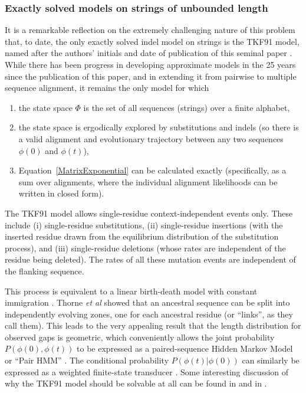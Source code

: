 \documentclass{bmcart}
\newcommand{\eqref}[1]{Equation~\ref{#1}}
\newcommand{\statespace}{\Phi}
\newcommand{\state}{\phi}
\begin{document}
\subsubsection*{Exactly solved models on strings of unbounded length}

It is a remarkable reflection on the extremely challenging nature of this problem
that, to date, the only exactly solved indel model on strings
is the TKF91 model, named after the authors' initials and date of publication
of this seminal paper \cite{ThorneEtal91}.
While there has been progress in developing approximate models in the 25 years since the publication of this paper,
and in extending it from pairwise to multiple sequence alignment,
it remains the only model for which
\begin{enumerate}
\item the state space $\statespace$ is the set of all sequences (strings) over a finite alphabet,
\item the state space is ergodically explored by substitutions and indels
(so there is a valid alignment and evolutionary trajectory between any two sequences $\state(0)$ and $\state(t)$),
\item \eqref{MatrixExponential} can be calculated exactly
 (specifically, as a sum over alignments,
  where the individual alignment likelihoods can be written in closed form).
\end{enumerate}

The TKF91 model allows single-residue context-independent events only.
These include (i) single-residue substitutions,
(ii) single-residue insertions (with the inserted residue drawn from the equilibrium distribution
of the substitution process), and
(iii) single-residue deletions (whose rates are independent of the residue being deleted).
The rates of all these mutation events are independent of the flanking sequence.

This process is equivalent to a linear birth-death model with constant immigration
\cite{Feller71}.
Thorne {\em et al} showed that 
an ancestral sequence can be split into independently evolving zones, one for each ancestral residue
(or ``links'', as they call them).
This leads to the very appealing result that the length distribution for observed gaps is geometric,
which conveniently allows the joint probability $P(\state(0),\state(t))$ to be expressed
as a paired-sequence Hidden Markov Model or ``Pair HMM'' \cite{HolmesBruno2001}.
The conditional probability $P(\state(t)|\state(0))$
can similarly be expressed as a weighted finite-state transducer \cite{Holmes2003,WestessonEtAl2012,BouchardCote2013}.
\color{red}
Some interesting discussion of why the TKF91 model should be solvable at all can be found in
\cite{Metzler2003} and in \cite{pmid22644340}.
\color{black}
\end{document}
